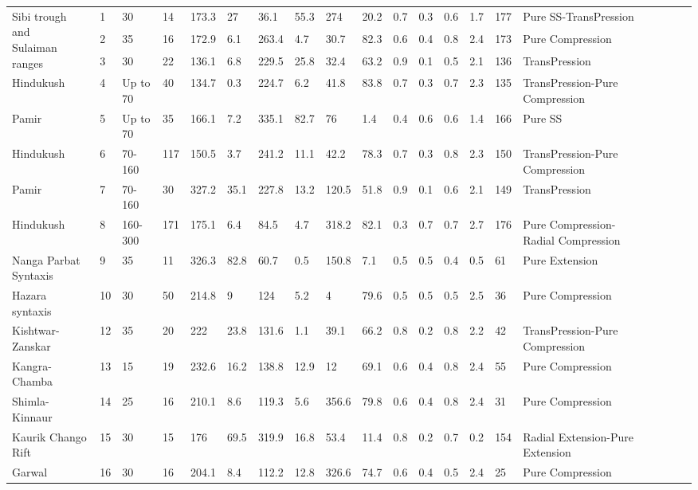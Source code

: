 \begin{flushleft}
\begin{table}[ht]
{\begin{tabular}{p{2cm}lllp{0.5cm}lllllllllllllp{1.2cm}p{2.5cm}}
\multirow{3}{*}{\parbox{3.5cm}{Sibi trough\\ and \\ Sulaiman ranges}} & 1 & 30 & 14 & 173.3 & 27 & 36.1 & 55.3 & 274 & 20.2 & 0.7 & 0.3 & 0.6 & 1.7 & 177 & Pure SS-TransPression \\
 & 2 & 35 & 16 & 172.9 & 6.1 & 263.4 & 4.7 & 30.7 & 82.3 & 0.6 & 0.4 & 0.8 & 2.4 & 173 & Pure Compression \\
 & 3 & 30 & 22 & 136.1 & 6.8 & 229.5 & 25.8 & 32.4 & 63.2 & 0.9 & 0.1 & 0.5 & 2.1 & 136 & TransPression \\ \hline
Hindukush & 4 & Up to 70 & 40 & 134.7 & 0.3 & 224.7 & 6.2 & 41.8 & 83.8 & 0.7 & 0.3 & 0.7 & 2.3 & 135 & TransPression-Pure Compression \\ \hline
Pamir & 5 & Up to 70 & 35 & 166.1 & 7.2 & 335.1 & 82.7 & 76 & 1.4 & 0.4 & 0.6 & 0.6 & 1.4 & 166 & Pure SS \\ \hline
Hindukush & 6 & 70-160 & 117 & 150.5 & 3.7 & 241.2 & 11.1 & 42.2 & 78.3 & 0.7 & 0.3 & 0.8 & 2.3 & 150 & TransPression-Pure Compression \\ \hline
Pamir & 7 & 70-160 & 30 & 327.2 & 35.1 & 227.8 & 13.2 & 120.5 & 51.8 & 0.9 & 0.1 & 0.6 & 2.1 & 149 & TransPression \\ \hline
Hindukush & 8 & 160-300 & 171 & 175.1 & 6.4 & 84.5 & 4.7 & 318.2 & 82.1 & 0.3 & 0.7 & 0.7 & 2.7 & 176 & Pure Compression-Radial Compression \\ \hline
Nanga   Parbat Syntaxis & 9 & 35 & 11 & 326.3 & 82.8 & 60.7 & 0.5 & 150.8 & 7.1 & 0.5 & 0.5 & 0.4 & 0.5 & 61 & Pure Extension \\ \hline
Hazara   syntaxis & 10 & 30 & 50 & 214.8 & 9 & 124 & 5.2 & 4 & 79.6 & 0.5 & 0.5 & 0.5 & 2.5 & 36 & Pure Compression \\ \hline
Kishtwar-Zanskar & 12 & 35 & 20 & 222 & 23.8 & 131.6 & 1.1 & 39.1 & 66.2 & 0.8 & 0.2 & 0.8 & 2.2 & 42 & TransPression-Pure Compression \\ \hline
Kangra-Chamba & 13 & 15 & 19 & 232.6 & 16.2 & 138.8 & 12.9 & 12 & 69.1 & 0.6 & 0.4 & 0.8 & 2.4 & 55 & Pure Compression \\ \hline
Shimla-Kinnaur & 14 & 25 & 16 & 210.1 & 8.6 & 119.3 & 5.6 & 356.6 & 79.8 & 0.6 & 0.4 & 0.8 & 2.4 & 31 & Pure Compression \\ \hline
Kaurik   Chango Rift & 15 & 30 & 15 & 176 & 69.5 & 319.9 & 16.8 & 53.4 & 11.4 & 0.8 & 0.2 & 0.7 & 0.2 & 154 & Radial Extension-Pure Extension \\ \hline
Garwal & 16 & 30 & 16 & 204.1 & 8.4 & 112.2 & 12.8 & 326.6 & 74.7 & 0.6 & 0.4 & 0.5 & 2.4 & 25 & Pure Compression \\ \hline

\end{tabular}}
\end{table}
\end{flushleft}
